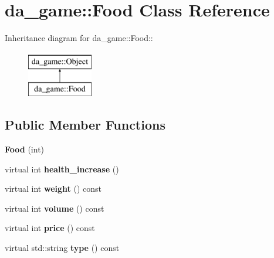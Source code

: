 \hypertarget{classda__game_1_1Food}{
\section{da\_\-game::Food Class Reference}
\label{classda__game_1_1Food}
}
Inheritance diagram for da\_\-game::Food::\begin{figure}[H]
\begin{center}
\leavevmode
\includegraphics[height=2cm]{classda__game_1_1Food}
\end{center}
\end{figure}
\subsection*{Public Member Functions}
\begin{DoxyCompactItemize}
\item 
\hypertarget{classda__game_1_1Food_ace85d7a8d2b7ae667e8e6d4dc4ec643b}{
{\bfseries Food} (int)}
\label{classda__game_1_1Food_ace85d7a8d2b7ae667e8e6d4dc4ec643b}

\item 
\hypertarget{classda__game_1_1Food_a115b3f00c2184d44adb4252797147f96}{
virtual int {\bfseries health\_\-increase} ()}
\label{classda__game_1_1Food_a115b3f00c2184d44adb4252797147f96}

\item 
\hypertarget{classda__game_1_1Food_a55206a8d4aa3087dce11e629e19befa6}{
virtual int {\bfseries weight} () const }
\label{classda__game_1_1Food_a55206a8d4aa3087dce11e629e19befa6}

\item 
\hypertarget{classda__game_1_1Food_a892fdedaedee16235e95522e618d3631}{
virtual int {\bfseries volume} () const }
\label{classda__game_1_1Food_a892fdedaedee16235e95522e618d3631}

\item 
\hypertarget{classda__game_1_1Food_ad4459dbe0fa30adca487386c91e2a060}{
virtual int {\bfseries price} () const }
\label{classda__game_1_1Food_ad4459dbe0fa30adca487386c91e2a060}

\item 
\hypertarget{classda__game_1_1Food_a0b0cb45b8b004e061a06faf76d6d855d}{
virtual std::string {\bfseries type} () const }
\label{classda__game_1_1Food_a0b0cb45b8b004e061a06faf76d6d855d}

\end{DoxyCompactItemize}
